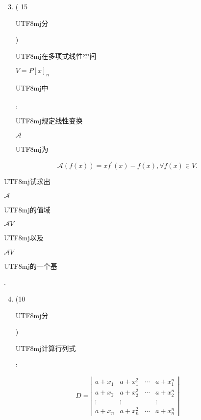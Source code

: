 \documentclass[10pt]{article}
\begin{document}
\begin{enumerate}
  \setcounter{enumi}{2}
  \item ( 15 \begin{CJK}{UTF8}{mj}分\end{CJK}) \begin{CJK}{UTF8}{mj}在多项式线性空间\end{CJK} $V=P[x]_{n}$ \begin{CJK}{UTF8}{mj}中\end{CJK}, \begin{CJK}{UTF8}{mj}规定线性变换\end{CJK} $\mathscr{A}$ \begin{CJK}{UTF8}{mj}为\end{CJK}
\end{enumerate}
$$
\mathscr{A}(f(x))=x f^{\prime}(x)-f(x), \forall f(x) \in V .
$$
\begin{CJK}{UTF8}{mj}试求出\end{CJK} $\mathscr{A}$ \begin{CJK}{UTF8}{mj}的值域\end{CJK} $\mathscr{A} V$ \begin{CJK}{UTF8}{mj}以及\end{CJK} $\mathscr{A} V$ \begin{CJK}{UTF8}{mj}的一个基\end{CJK}.

\begin{enumerate}
  \setcounter{enumi}{3}
  \item (10 \begin{CJK}{UTF8}{mj}分\end{CJK}) \begin{CJK}{UTF8}{mj}计算行列式\end{CJK}:
\end{enumerate}
$$
D=\left|\begin{array}{cccc}
a+x_{1} & a+x_{1}^{2} & \cdots & a+x_{1}^{n} \\
a+x_{2} & a+x_{2}^{2} & \cdots & a+x_{2}^{n} \\
\vdots & \vdots & & \vdots \\
a+x_{n} & a+x_{n}^{2} & \cdots & a+x_{n}^{n}
\end{array}\right|
$$
\end{document}
